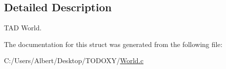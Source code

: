 \subsection{Detailed Description}
T\-A\-D World. 


\begin{DoxyItemize}
\item 
\end{DoxyItemize}

The documentation for this struct was generated from the following file\-:\begin{DoxyCompactItemize}
\item 
C\-:/\-Users/\-Albert/\-Desktop/\-T\-O\-D\-O\-X\-Y/\hyperlink{_world_8c}{World.\-c}\end{DoxyCompactItemize}
